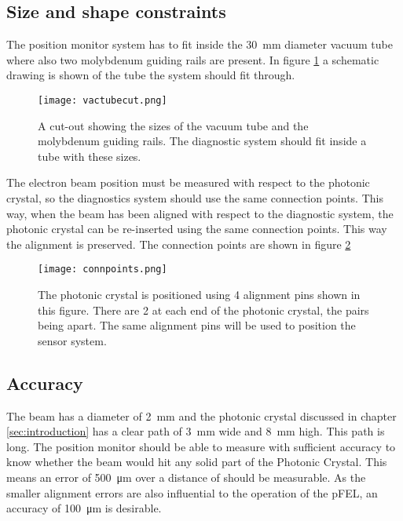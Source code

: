 \subsection{Size and shape constraints}
The position monitor system has to fit inside the \SI{30}{\milli\meter} diameter vacuum tube where also two molybdenum guiding rails are present. In figure \ref{fig:vacuumtube} a schematic drawing is shown of the tube the system should fit through.
\begin{figure}[h]
 \centering
 \texttt{[image: vactubecut.png]}
 \caption{A cut-out showing the sizes of the vacuum tube and the molybdenum guiding rails. The diagnostic system should fit inside a tube with these sizes.}
 \label{fig:vacuumtube}
\end{figure}
The electron beam position must be measured with respect to the photonic crystal, so the diagnostics system should use the same connection points. This way, when the beam has been aligned with respect to the diagnostic system, the photonic crystal can be re-inserted using the same connection points. This way the alignment is preserved. The connection points are shown in figure \ref{fig:connpoints}
\begin{figure}[H]
 \centering
 \texttt{[image: connpoints.png]}
 \caption{The photonic crystal is positioned using 4 alignment pins shown in this figure. There are 2 at each end of the photonic crystal, the pairs being  apart. The same alignment pins will be used to position the sensor system. }
 \label{fig:connpoints}
\end{figure}

\subsection{Accuracy}
The beam has a diameter of \SI{2}{\milli\meter} and the photonic crystal discussed in chapter \ref{sec:introduction} has a clear path of \SI{3}{\milli\meter} wide and \SI{8}{\milli\meter} high. This path is  long. The position monitor should be able to measure with sufficient accuracy to know whether the beam would hit any solid part of the Photonic Crystal. This means an error of \SI{500}{\micro\meter} over a distance of  should be measurable. As the smaller alignment errors are also influential to the operation of the pFEL,  an accuracy of \SI{100}{\micro\meter} is desirable.


